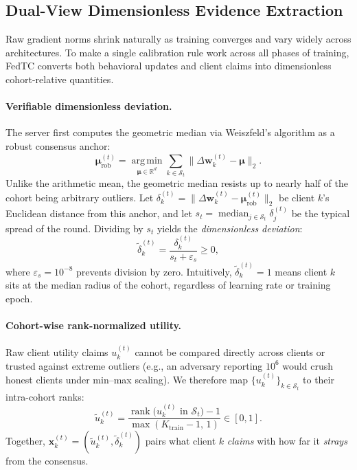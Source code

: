 \subsection{Dual-View Dimensionless Evidence Extraction}
\label{sec:dual_view}

Raw gradient norms shrink naturally as training converges and vary widely across architectures. To make a single calibration rule work across all phases of training, FedTC converts both behavioral updates and client claims into dimensionless cohort-relative quantities.

\paragraph{Verifiable dimensionless deviation.}
The server first computes the geometric median via Weiszfeld's algorithm as a robust consensus anchor:
\begin{equation}
    \boldsymbol{\mu}_{\mathrm{rob}}^{(t)} = \operatorname*{arg\,min}_{\boldsymbol{\mu}\in\mathbb{R}^d} \sum_{k\in\mathcal{S}_t} \big\|\Delta\mathbf{w}_k^{(t)} - \boldsymbol{\mu}\big\|_2.
    \label{eq:geom_median}
\end{equation}
Unlike the arithmetic mean, the geometric median resists up to nearly half of the cohort being arbitrary outliers. Let $\delta_k^{(t)} = \|\Delta\mathbf{w}_k^{(t)} - \boldsymbol{\mu}_{\mathrm{rob}}^{(t)}\|_2$ be client $k$'s Euclidean distance from this anchor, and let $s_t = \operatorname{median}_{j\in\mathcal{S}_t} \delta_j^{(t)}$ be the typical spread of the round. Dividing by $s_t$ yields the \emph{dimensionless deviation}:
\begin{equation}
    \tilde{\delta}_k^{(t)} = \frac{\delta_k^{(t)}}{s_t + \varepsilon_s} \ge 0,
    \label{eq:delta_tilde}
\end{equation}
where $\varepsilon_s = 10^{-8}$ prevents division by zero. Intuitively, $\tilde{\delta}_k^{(t)} = 1$ means client $k$ sits at the median radius of the cohort, regardless of learning rate or training epoch.

\paragraph{Cohort-wise rank-normalized utility.}
Raw client utility claims $u_k^{(t)}$ cannot be compared directly across clients or trusted against extreme outliers (e.g., an adversary reporting $10^6$ would crush honest clients under min--max scaling). We therefore map $\{u_k^{(t)}\}_{k\in\mathcal{S}_t}$ to their intra-cohort ranks:
\begin{equation}
    \tilde{u}_k^{(t)} = \frac{\operatorname{rank}\!\big(u_k^{(t)} \text{ in } \mathcal{S}_t\big) - 1}{\max(K_{\mathrm{train}} - 1,\, 1)} \in [0, 1].
    \label{eq:u_norm}
\end{equation}
Together, $\mathbf{x}_k^{(t)} = (\tilde{u}_k^{(t)}, \tilde{\delta}_k^{(t)})$ pairs what client $k$ \emph{claims} with how far it \emph{strays} from the consensus.

